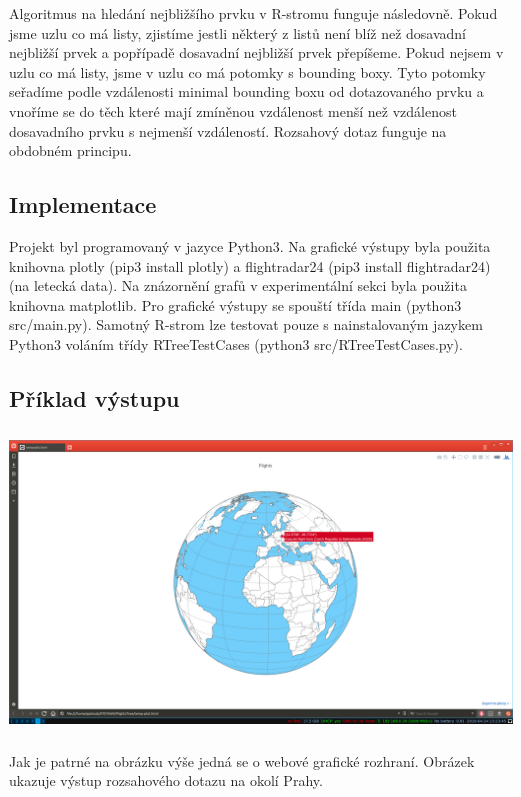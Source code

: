 \documentclass[12pt,a4paper]{article}
\begin{document}
Algoritmus na hledání nejbližšího prvku v R-stromu funguje následovně\cite{queries}. Pokud jsme uzlu co má listy, zjistíme jestli některý z listů není blíž než dosavadní nejbližší prvek a popřípadě dosavadní nejbližší prvek přepíšeme. Pokud nejsem v uzlu co má listy, jsme v uzlu co má potomky s bounding boxy. Tyto potomky seřadíme podle vzdálenosti minimal bounding boxu od dotazovaného prvku a vnoříme se do těch které mají zmíněnou vzdálenost menší než vzdálenost dosavadního prvku s nejmenší vzdáleností. Rozsahový dotaz funguje na obdobném principu. 
\par \bigskip

\subsection*{Implementace}
Projekt byl programovaný v jazyce Python3. Na grafické výstupy byla použita knihovna plotly (pip3 install plotly) a flightradar24 (pip3 install flightradar24) (na letecká data). Na znázornění grafů v experimentální sekci byla použita knihovna matplotlib. Pro grafické výstupy se spouští třída main (python3 src/main.py). Samotný R-strom lze testovat pouze s nainstalovaným jazykem Python3 voláním třídy RTreeTestCases (python3 src/RTreeTestCases.py).\par \bigskip

\subsection*{Příklad výstupu} \par \bigskip
\begin{center}
\includegraphics[width=15cm, height=8cm]{output1}
\end{center}
Jak je patrné na obrázku výše jedná se o webové grafické rozhraní. Obrázek ukazuje výstup rozsahového dotazu na okolí Prahy.
\end{document}
